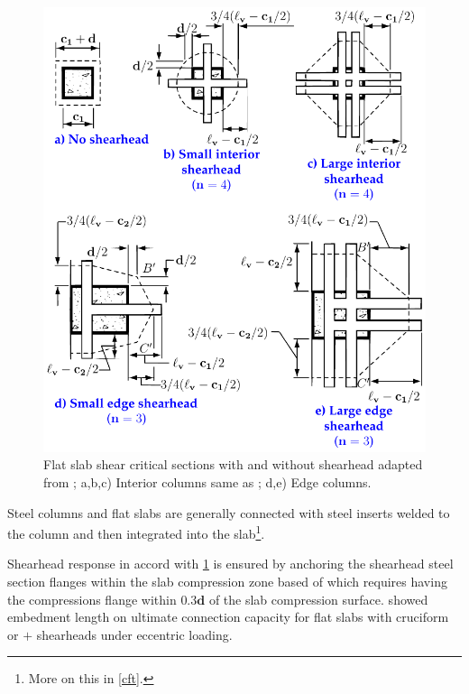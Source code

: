 \begin{figure}\centering
\includegraphics[width=\columnwidth]{Figures/tikzout/fr2269814.pdf}
\caption{Flat slab shear critical sections with and without shearhead adapted from \cite{ACI31814}; a,b,c) Interior columns same as \cite{hawkins1974a}; d,e) Edge columns.}\label{fr2269814}
\end{figure}
Steel columns and flat slabs are generally connected with steel inserts welded to the column and then integrated into the slab\footnote{More on this in \ref{cft}.}.

Shearhead response in accord with \ref{fr2269814} is ensured by anchoring the shearhead steel section flanges within the slab compression zone based of which \cite{aci31871} requires having the compressions flange within $0.3\mathbf{d}$ of the slab compression surface. \cite{godycki1984} showed embedment length on ultimate connection capacity for flat slabs with cruciform or $+$ shearheads under eccentric loading.

